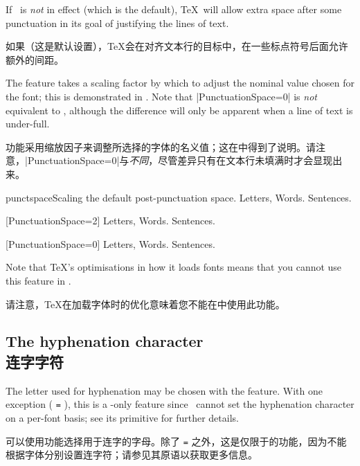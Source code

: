 \documentclass[a4paper]{l3doc}
\begin{document}
If \cmd\frenchspacing\ is \emph{not} in effect (which is the default), \TeX\ will allow extra space after some punctuation in its goal of justifying the lines of text.

如果\cmd{}（这是默认设置），\TeX 会在对齐文本行的目标中，在一些标点符号后面允许额外的间距。

The  feature takes a scaling factor by which to
adjust the nominal value chosen for the font; this is demonstrated in
.
Note that |PunctuationSpace=0|
is \emph{not} equivalent to \cmd\frenchspacing, although the difference
will only be apparent when a line of text is under-full.

功能采用缩放因子来调整所选择的字体的名义值；这在中得到了说明。请注意，|PunctuationSpace=0|与\cmd\frenchspacing\emph{不同}，尽管差异只有在文本行未填满时才会显现出来。


\begin{Lexample}{punctspace}{Scaling the default post-punctuation space.}
  \nonfrenchspacing
   Letters, Words. Sentences.          \par
  [PunctuationSpace=2]
   Letters, Words. Sentences.          \par
  [PunctuationSpace=0]
   Letters, Words. Sentences.
\end{Lexample}

Note that \TeX's optimisations in how it loads fonts means that you cannot
use this feature in .

请注意，\TeX 在加载字体时的优化意味着您不能在中使用此功能。

\subsection{The hyphenation character\\连字字符}

The letter used for hyphenation may be chosen with the 
feature.
With one exception ( \texttt{=} ),
this is a \XeTeX-only feature since \LuaTeX\ cannot set the hyphenation character on a per-font basis;
see its  primitive for further details.

可以使用功能选择用于连字的字母。除了 \texttt{=} 之外，这是仅限于\XeTeX 的功能，因为\LuaTeX 不能根据字体分别设置连字符；请参见其原语以获取更多信息。
\end{document}
